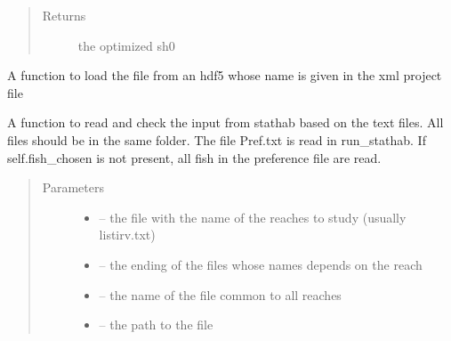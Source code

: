 \documentclass[letterpaper,10pt,english]{sphinxmanual}
\begin{document}
\begin{fulllineitems}
\begin{fulllineitems}
\begin{quote}
\begin{description}
\begin{itemize}
\end{itemize}

\item[{Returns}] \leavevmode
the optimized sh0

\end{description}\end{quote}

\end{fulllineitems}


\begin{fulllineitems}
\label{\detokenize{index:src.stathab_c.Stathab.load_stathab_from_hdf5}}
A function to load the file from an hdf5 whose name is given in the xml project file

\end{fulllineitems}


\begin{fulllineitems}
\label{\detokenize{index:src.stathab_c.Stathab.load_stathab_from_txt}}
A function to read and check the input from stathab based on the text files.
All files should be in the same folder.
The file Pref.txt is read in run\_stathab.
If self.fish\_chosen is not present, all fish in the preference file are read.
\begin{quote}\begin{description}
\item[{Parameters}] \leavevmode\begin{itemize}
\item {} 
 -- the file with the name of the reaches to study (usually listirv.txt)

\item {} 
 -- the ending of the files whose names depends on the reach

\item {} 
 -- the name of the file common to all reaches

\item {} 
 -- the path to the file


\end{itemize}
\end{description}
\end{quote}
\end{fulllineitems}
\end{fulllineitems}
\end{document}
